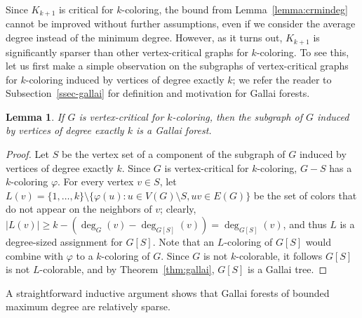 \documentclass[12pt,twoside,openright,a4paper]{book}
\newtheorem{lemma}[theorem]{Lemma}
\begin{document}
Since $K_{k+1}$ is critical for $k$-coloring, the bound from Lemma~\ref{lemma:crmindeg} cannot be improved without
further assumptions, even if we consider the average degree instead of the minimum degree.
However, as it turns out, $K_{k+1}$ is significantly sparser than other vertex-critical graphs for $k$-coloring.
To see this, let us first make a simple observation on the subgraphs of vertex-critical graphs for $k$-coloring induced by vertices
of degree exactly $k$; we refer the reader to Subsection~\ref{ssec-gallai} for definition and motivation for Gallai forests.

\begin{lemma}\label{lemma:degkgal}
If $G$ is vertex-critical for $k$-coloring, then the subgraph of $G$ induced by vertices of degree exactly $k$
is a Gallai forest.
\end{lemma}
\begin{proof}
Let $S$ be the vertex set of a component of the subgraph of $G$ induced by vertices of degree exactly $k$.
Since $G$ is vertex-critical for $k$-coloring, $G-S$ has a $k$-coloring $\varphi$.  For every vertex $v\in S$,
let $L(v)=\{1,\ldots,k\}\setminus\{\varphi(u):u\in V(G)\setminus S, uv\in E(G)\}$ be the set of colors that do
not appear on the neighbors of $v$; clearly, $|L(v)|\ge k-(\deg_G(v)-\deg_{G[S]}(v))=\deg_{G[S]}(v)$,
and thus $L$ is a degree-sized assignment for $G[S]$.  Note that an $L$-coloring of $G[S]$ would combine
with $\varphi$ to a $k$-coloring of $G$.  Since $G$ is not $k$-colorable, it follows $G[S]$ is not $L$-colorable,
and by Theorem~\ref{thm:gallai}, $G[S]$ is a Gallai tree.
\end{proof}

A straightforward inductive argument shows that Gallai forests of bounded maximum degree are relatively sparse.
\end{document}
